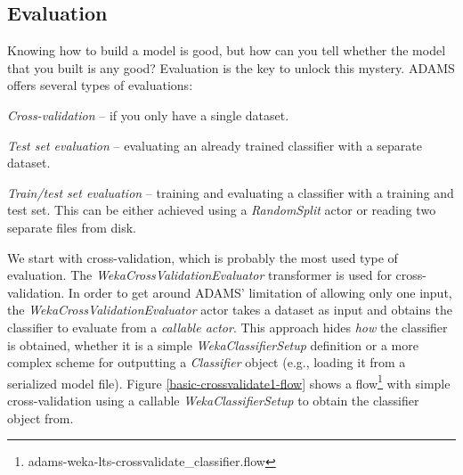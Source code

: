 \clearpage
\subsection{Evaluation}
Knowing how to build a model is good, but how can you tell whether the model
that you built is any good? Evaluation is the key to unlock this mystery.
ADAMS offers several types of evaluations:
\begin{tight_itemize}
	\item \textit{Cross-validation} -- if you only have a single dataset.
	\item \textit{Test set evaluation} -- evaluating an already trained classifier
	with a separate dataset.
	\item \textit{Train/test set evaluation} -- training and evaluating a
	classifier with a training and test set. This can be either achieved using a
	\textit{RandomSplit} actor or reading two separate files from disk.
\end{tight_itemize}

We start with cross-validation, which is probably the most used type of
evaluation. The \textit{WekaCrossValidationEvaluator} transformer is used for
cross-validation. In order to get around ADAMS' limitation of allowing only one
input, the \textit{WekaCrossValidationEvaluator} actor takes a dataset as input
and obtains the classifier to evaluate from a \textit{callable actor}. This
approach hides \textit{how} the classifier is obtained, whether it is a simple
\textit{WekaClassifierSetup} definition or a more complex scheme for outputting a
\textit{Classifier} object (e.g., loading it from a serialized model file).
Figure \ref{basic-crossvalidate1-flow} shows a
flow\footnote{adams-weka-lts-crossvalidate\_classifier.flow} with simple
cross-validation using a callable \textit{WekaClassifierSetup} to obtain the classifier
object from.

